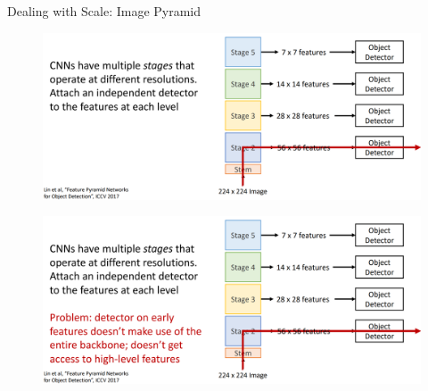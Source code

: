 \begin{frame}[allowframebreaks]{Dealing with Scale: Image Pyramid}
\begin{figure}
\centering
\includegraphics[width=1.0\textwidth,height=1.0\textheight,keepaspectratio]{images/object-detect/scale_4.png}
\end{figure}

\framebreak

\begin{figure}
\centering
\includegraphics[width=1.0\textwidth,height=1.0\textheight,keepaspectratio]{images/object-detect/scale_5.png}
\end{figure}
    
\end{frame}

